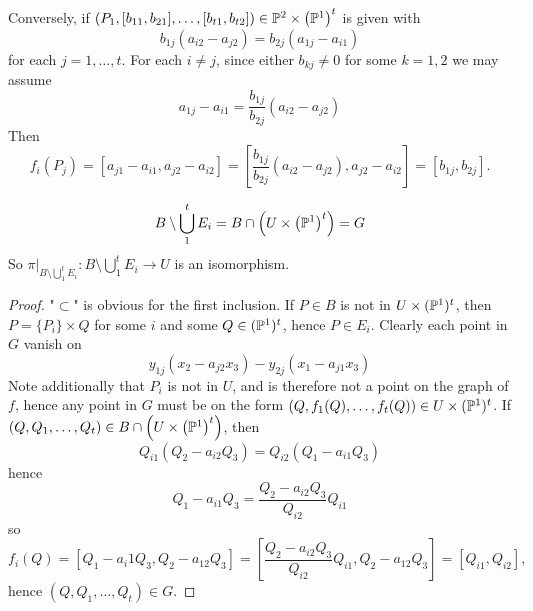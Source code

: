     Conversely, if $(P_1,[b_{11},b_{21}],\dots,[b_{t1},b_{t2}])\in \mathbb{P}^2\times \left(\mathbb{P}^1\right)^t$ is given with
    $$
        b_{1j}(a_{i2}-a_{j2}) = b_{2j}(a_{1j}-a_{i1})
    $$
    for each $j=1,\dots,t$. For each $i\neq j$, since either $b_{kj}\neq 0$ for some $k=1,2$ we may assume 
    $$
        a_{1j}-a_{i1} = \frac{b_{1j}}{b_{2j}}(a_{i2}-a_{j2})
    $$ 
    Then 
    $$f_i(P_j)=[a_{j1}-a_{i1},a_{j2}-a_{i2}]=\left[\frac{b_{1j}}{b_{2j}}(a_{i2}-a_{j2}),a_{j2}-a_{i2}\right]=[b_{1j},b_{2j}].$$
    \begin{lemma}
        $$
            B\setminus \bigcup_1^t E_i = B\cap \left(U\times \left(\mathbb{P}^1\right)^t\right) = G
        $$
        So $\left.\pi\right|_{B\setminus \bigcup_1^t E_i} : B\setminus \bigcup_1^t E_i \rightarrow U$ is an isomorphism.
    \end{lemma}
    \begin{proof}
        "$\subset$" is obvious for the first inclusion. If $P\in B$ is not in $U\times (\mathbb{P}^1)^t$, then $P=\{P_i\}\times Q$ for some $i$ and some $Q\in (\mathbb{P}^1)^t$, hence $P\in E_i$. Clearly each point in $G$ vanish on 
        $$
            y_{1j}(x_2-a_{j2}x_3)-y_{2j}(x_1-a_{j1}x_3)
        $$
        Note additionally that $P_i$ is not in $U$, and is therefore not a point on the graph of $f$, hence any point in $G$ must be on the form $(Q,f_1(Q),\dots,f_t(Q))\in U\times (\mathbb{P}^1)^t$. If $(Q,Q_1,\dots,Q_t)\in B\cap \left(U\times \left(\mathbb{P}^1\right)^t\right)$, then 
        $$
            Q_{i1}(Q_2-a_{i2}Q_3)=Q_{i2}(Q_1-a_{i1}Q_3)
        $$ 
        hence 
        $$
            Q_1-a_{i1}Q_3 = \frac{Q_2-a_{i2}Q_3}{Q_{i2}} Q_{i1}
        $$
        so 
        $$
            f_i(Q)=[Q_1-a_i1Q_3,Q_2-a_{12}Q_3]= \left[\frac{Q_2-a_{i2}Q_3}{Q_{i2}} Q_{i1},Q_2-a_{12}Q_3\right] = [Q_{i1},Q_{i2}],  
        $$
        hence $(Q,Q_1,\dots,Q_t)\in G$.  
    \end{proof}
